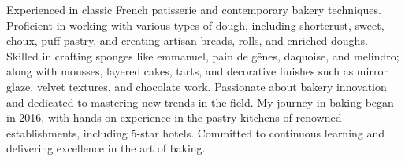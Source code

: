 

\begin{cvparagraph}

Experienced in classic French patisserie and contemporary bakery techniques. Proficient in working with various types of dough, including shortcrust, sweet, choux, puff pastry, and creating artisan breads, rolls, and enriched doughs. Skilled in crafting sponges like emmanuel, pain de gênes, daquoise, and melindro; along with mousses, layered cakes, tarts, and decorative finishes such as mirror glaze, velvet textures, and chocolate work. Passionate about bakery innovation and dedicated to mastering new trends in the field. My journey in baking began in 2016, with hands-on experience in the pastry kitchens of renowned establishments, including 5-star hotels. Committed to continuous learning and delivering excellence in the art of baking.
\end{cvparagraph}
